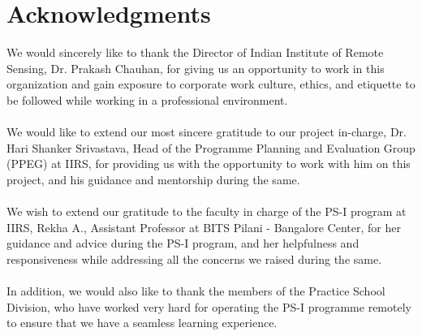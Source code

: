 \documentclass[12pt, a4paper]{report}
\begin{document}
\pagebreak

\setcounter{secnumdepth}{0}
\section{Acknowledgments}
\pagestyle{plain}
\setcounter{page}{3}
We would sincerely like to thank the Director of Indian Institute of Remote Sensing, Dr. Prakash Chauhan, for giving us an opportunity to work in this organization and gain exposure to corporate work culture, ethics, and etiquette to be followed while working in a professional environment.
\paragraph{}
We would like to extend our most sincere gratitude to our project in-charge, Dr. Hari Shanker Srivastava, Head of the Programme Planning and Evaluation Group (PPEG) at IIRS, for providing us with the opportunity to work with him on this project, and his guidance and mentorship during the same.
\paragraph{}
We wish to extend our gratitude to the faculty in charge of the PS-I program at IIRS, Rekha A., Assistant Professor at BITS Pilani - Bangalore Center, for her guidance and advice during the PS-I program, and her helpfulness and responsiveness while addressing all the concerns we raised during the same.
\paragraph{}
In addition, we would also like to thank the members of the Practice School Division, who have worked very hard for operating the PS-I programme remotely to ensure that we have a seamless learning experience.
\pagebreak
\end{document}
